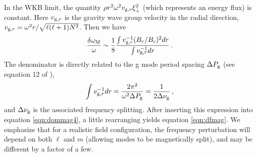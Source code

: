 In the WKB limit, the quantity $\rho r^2 \omega^2 v_{{\rm g},r} \xi_\perp^2$ (which represents an energy flux) is constant. Here $v_{{\rm g},r}$ is the gravity wave group velocity in the radial direction, $v_{{\rm g},r} = \omega^2 r/\sqrt{\ell(\ell+1)N^2}$. Then we have
\begin{equation}
\label{eqn:dommag4}
\frac{\delta \omega_{\rm M}}{\omega} \sim \frac{1}{8} \frac{\int v_{{\rm g},r}^{-1} (B_r/B_c)^2 d r }{\int v_{{\rm g},r}^{-1} d r }\, .
\end{equation}
The denominator is directly related to the g mode period spacing $\Delta P_{\rm g}$ (see equation 12 of \cite{Chaplin_2013}),
\begin{equation}
\label{eqn:dpg}
\int v_{{\rm g},r}^{-1} dr = \frac{2 \pi^2}{\omega^2 \Delta P_{\rm g}} = \frac{1}{2 \Delta \nu_{\rm g}} \, ,
\end{equation}
and $\Delta \nu _{\rm g}$ is the associated frequency splitting. After inserting this expression into equation \ref{eqn:dommag4}, a little rearranging yields equation \ref{eqn:dfmag}. We emphasize that for a realistic field configuration, the frequency perturbation will depend on both $\ell$ and $m$ (allowing modes to be magnetically split), and may be different by a factor of a few.

